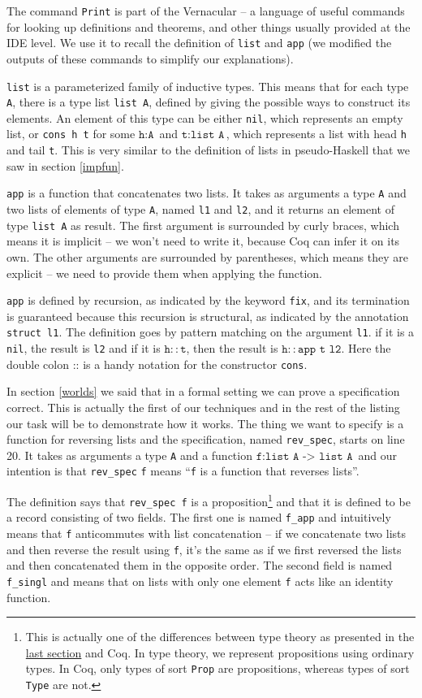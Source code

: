 \documentclass[declaration,mgr,english,shortabstract]{iithesis}
\newcommand{\m}[1]{\texttt{#1}}
\begin{document}
The command \m{Print} is part of the Vernacular -- a language of useful commands for looking up definitions and theorems, and other things usually provided at the IDE level. We use it to recall the definition of \m{list} and \m{app} (we modified the outputs of these commands to simplify our explanations).

\m{list} is a parameterized family of inductive types. This means that for each type \m{A}, there is a type list \m{list A}, defined by giving the possible ways to construct its elements. An element of this type can be either \m{nil}, which represents an empty list, or \m{cons h t} for some $\m{h} : \m{A}$ and $\m{t} : \m{list A}$, which represents a list with head \m{h} and tail \m{t}. This is very similar to the definition of lists in pseudo-Haskell that we saw in section \ref{impfun}.

\m{app} is a function that concatenates two lists. It takes as arguments a type \m{A} and two lists of elements of type \m{A}, named \m{l1} and \m{l2}, and it returns an element of type \m{list A} as result. The first argument is surrounded by curly braces, which means it is implicit -- we won't need to write it, because Coq can infer it on its own. The other arguments are surrounded by parentheses, which means they are explicit -- we need to provide them when applying the function.

\m{app} is defined by recursion, as indicated by the keyword \m{fix}, and its termination is guaranteed because this recursion is structural, as indicated by the annotation \m{struct l1}. The definition goes by pattern matching on the argument \m{l1}. if it is a \m{nil}, the result is \m{l2} and if it is $\m{h} :: \m{t}$, then the result is $\m{h} :: \m{app t l2}$. Here the double colon $\m{::}$ is a handy notation for the constructor \m{cons}.

In section \ref{worlds} we said that in a formal setting we can prove a specification correct. This is actually the first of our techniques and in the rest of the listing our task will be to demonstrate how it works. The thing we want to specify is a function for reversing lists and the specification, named \m{rev\_spec}, starts on line 20. It takes as arguments a type \m{A} and a function $\m{f} : \m{list A -> list A}$ and our intention is that \m{rev\_spec} \m{f} means ``\m{f} is a function that reverses lists''.

The definition says that \m{rev\_spec f} is a proposition\footnote{This is actually one of the differences between type theory as presented in the \hyperref[mltt]{last section} and Coq. In type theory, we represent propositions using ordinary types. In Coq, only types of sort \m{Prop} are propositions, whereas types of sort \m{Type} are not.} and that it is defined to be a record consisting of two fields. The first one is named \m{f\_app} and intuitively means that \m{f} anticommutes with list concatenation -- if we concatenate two lists and then reverse the result using \m{f}, it's the same as if we first reversed the lists and then concatenated them in the opposite order. The second field is named \m{f\_singl} and means that on lists with only one element \m{f} acts like an identity function.
\end{document}
